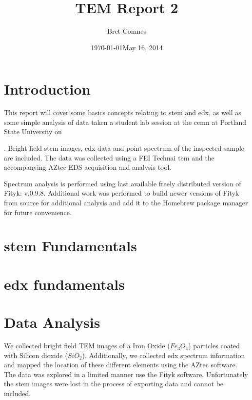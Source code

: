 \documentclass[12pt,a4paper]{article}
\title{TEM Report 2}
\author{Bret Comnes}
\date{\today}
\begin{document}
\maketitle

\section{Introduction} %

This report will cover some basics concepts relating to \ac{stem} and \ac{edx}, as well as some simple analysis of data taken a student lab session at the \ac{cemn} at Portland State University on \date{May 16, 2014}.  Bright field \ac{stem} images, \ac{edx} data and point spectrum of the inspected sample are included.  The data was collected using a FEI Technai \ac{tem} and the accompanying AZtec EDS acquisition and analysis tool.

Spectrum analysis is performed using last available freely distributed version of Fityk\cite{ft}: v.0.9.8.  Additional work was performed to build newer versions of Fityk from source for additional analysis  and add it to the Homebrew\cite{HB} package manager for future convenience.


\section{\ac{stem} Fundamentals} %
\label{sec:stem}

\lipsum[6] %


\lipsum[6] %


\section{\ac{edx} fundamentals} %
\label{sec:edx}

\lipsum[6] %

\lipsum[6] %

\lipsum[6] %


\section{Data Analysis} %
\label{sec:data_analysis}

We collected bright field TEM images of a Iron Oxide ($Fe_3O_4$) particles coated with Silicon dioxide ($SiO_2$).  Additionally, we collected \ac{edx} spectrum information and mapped the location of these different elements using the AZtec software.  The data was explored in a limited manner use the Fityk software.  Unfortunately the \ac{stem} images were lost in the process of exporting data and cannot be included.
\end{document}
